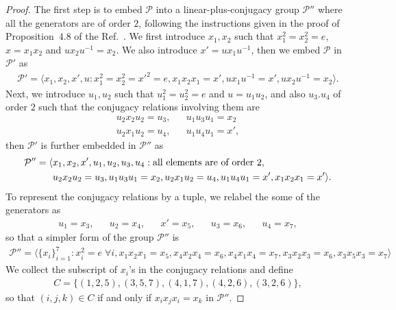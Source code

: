 \documentclass[11pt,letterpaper]{article}
\newcommand{\1}{\mathbb{1}}
\newcommand{\Pg}{\mathcal{P}}
\theoremstyle{definition}
\begin{document}
\begin{proof}
The first step is to embed $\Pg$ into a linear-plus-conjugacy group $\Pg''$ where
all the generators are of order $2$, following the instructions given in the proof of  
Proposition~$4.8$ of the Ref.~\cite{slofstra2017}.
We first introduce $x_1,x_2$ such that $x_1^2=x_2^2=e$, $x=x_1x_2$ and $u x_2 u^{-1}=x_2$.
We also introduce $x' = ux_1u^{-1}$, 
then we embed $\Pg$ in $\Pg'$ as
\begin{align}
	\Pg' = \langle x_1,x_2,x',u: x_1^2=x_2^2=x'^2=e,
	x_1x_2x_1=x', ux_1u^{-1}=x', ux_2u^{-1} =x_2 \rangle.
\end{align}
Next, we introduce $u_1,u_2$ such that $u_1^2=u_2^2=e$ and $u=u_1u_2$, 
and also $u_3.u_4$ of order $2$ such that the conjugacy relations involving them are 
\begin{align*}
u_2x_2u_2 = u_3, && u_1u_3u_1 = x_2\\
u_2x_1u_2 = u_4, && u_1u_4u_1 = x',
\end{align*}
then
$\Pg'$ is further embedded in $\Pg''$ as
\begin{equation}
\begin{aligned}
	\Pg'' =  \langle &x_1,x_2,x',u_1,u_2,u_3,u_4: \text{all elements are of order $2$},\notag\\
	 &u_2x_2u_2 = u_3, u_1u_3u_1 = x_2,
u_2x_1u_2 = u_4, u_1u_4u_1 = x',x_1x_2x_1=x' \rangle.
\end{aligned}
\end{equation}	
To represent the conjugacy relations by a tuple, we relabel the some of the generators as
\begin{align*}
	u_1 = x_3, && u_2 = x_4, && x' = x_5, && u_3 = x_6, && u_4 = x_7,
\end{align*}
so that a simpler form of the group $\Pg''$ is 
\begin{equation}
\begin{aligned}
	\Pg'' = \langle \{x_i\}_{i=1}^7 : x_i^2 = e \; \forall i, 
	x_1x_2x_1=x_5, x_4x_2x_4 = x_6,
	 x_4x_1x_4=x_7, x_3x_2x_3 = x_6, x_3x_5x_3=x_7\rangle
\end{aligned}
\end{equation}
We collect the subscript of $x_i$'s in the conjugacy relations and define
\begin{align}
	C= \{ (1,2,5), (3,5,7), (4,1,7), (4,2,6), (3,2,6)\},
\end{align}
so that $(i,j,k) \in C$ if and only if $x_ix_jx_i = x_k$ in $\Pg''$.


\end{proof}
\end{document}
